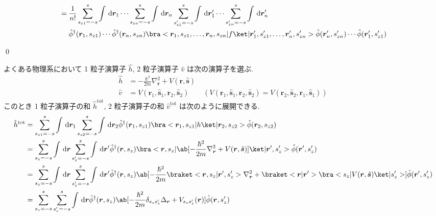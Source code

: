 \documentclass[uplatex,dvipdfmx,a4paper,11pt]{jlreq}
\makeatletter
\newcommand{\rr}{\bm{r}}
\renewcommand{\ss}{\bm{s}}
\numberwithin{equation}{section}
\theoremstyle{definition}
\renewenvironment{proof}[1][\proofname]{\par
  \normalfont
  \topsep6\p@\@plus6\p@ \trivlist
  \item[\hskip\labelsep{\bfseries #1}\@addpunct{\bfseries}]\ignorespaces\quad\par
}{
  \qed\endtrivlist\@endpefalse
}
\renewcommand\proofname{証明}
\makeatother
\begin{document}
\begin{proof}
\begin{align}
     & = \frac{1}{n!}\sum_{s_{z1} = -s}^s\int\dl{\rr_1}\cdots\sum_{s_{zn} = -s}^s\int\dl{\rr_n}\sum_{s_{z1}' = -s}^s\int\dl{\rr_1'}\cdots\sum_{s_{zn}' = -s}^s\int\dl{\rr_n'}                                                                           \\
     & \quad\ \hat{\phi}^\dagger(\rr_1, s_{z1})\cdots\hat{\phi}^\dagger(\rr_n, s_{zn})\bra<\rr_1,s_{z1},\ldots,\rr_n,s_{zn}|f\ket|\rr_1',s_{z1}',\ldots,\rr_n',s_{zn}'>\hat{\phi}(\rr_n', s_{zn}')\cdots\hat{\phi}(\rr_1', s_{z1}')
  \end{align}
\end{proof}
\begin{example}[Q21-87, Q21-88, Q21-89(i)(ii), Q21-90, Q21-91(i)(ii)(iii)(iv), Q21-92]
  よくある物理系において 1 粒子演算子 $\hat{h}$, 2 粒子演算子 $\hat{v}$ は次の演算子を選ぶ.
  \begin{align}
    \hat{h} & = - \frac{\hbar^2}{2m}\nabla_{\rr}^2 + V(\rr, \hat{\ss})                                                                                   \\
    \hat{v} & = V(\rr_1, \hat{\ss}_1, \rr_2, \hat{\ss}_2) \qquad (V(\rr_1, \hat{\ss}_1, \rr_2, \hat{\ss}_2) = V(\rr_2, \hat{\ss}_2, \rr_1, \hat{\ss}_1))
  \end{align}
  このとき 1 粒子演算子の和 $\hat{h}^{\mathrm{tot}}$, 2 粒子演算子の和 $\hat{v}^{\mathrm{tot}}$ は次のように展開できる.
  \begin{align}
    \hat{h}^{\mathrm{tot}} & = \sum_{s_{z1} = -s}^s\int\dl{\rr_1}\sum_{s_{z2} = -s}^s\int\dl{\rr_2}\hat{\phi}^\dagger(\rr_1, s_{z1})\bra<\rr_1,s_{z1}|h\ket|\rr_2,s_{z2}>\hat{\phi}(\rr_2, s_{z2})                                                                                                                               \\
                           & = \sum_{s_z = -s}^s\int\dl{\rr}\sum_{s_z' = -s}^s\int\dl{\rr'}\hat{\phi}^\dagger(\rr, s_z)\bra<\rr,s_z|\ab[-\frac{\hbar^2}{2m}\nabla_{\rr}^2 + V(\rr, \hat{\ss})]\ket|\rr',s_z'>\hat{\phi}(\rr', s_z')                                                                                              \\
                           & = \sum_{s_z = -s}^s\int\dl{\rr}\sum_{s_z' = -s}^s\int\dl{\rr'}\hat{\phi}^\dagger(\rr, s_z)\ab[-\frac{\hbar^2}{2m}\braket<\rr,s_z|\rr',s_z'>\nabla_{\rr}^2 + \braket<\rr|\rr'>\bra<s_z|V(\rr, \hat{\ss})\ket|s_z'>]\hat{\phi}(\rr', s_z')                                                            \\
                           & = \sum_{s_z = -s}^{s}\sum_{s_z' = -s}^{s}\int\dl{\rr}\hat{\phi}^\dagger(\rr, s_z)\ab[-\frac{\hbar^2}{2m}\delta_{s_zs_z'}\Delta_{\rr} + V_{s_zs_z'}(\rr)]\hat{\phi}(\rr, s_z')                                                                                                                       \\

\end{align}
\end{example}
\end{document}
